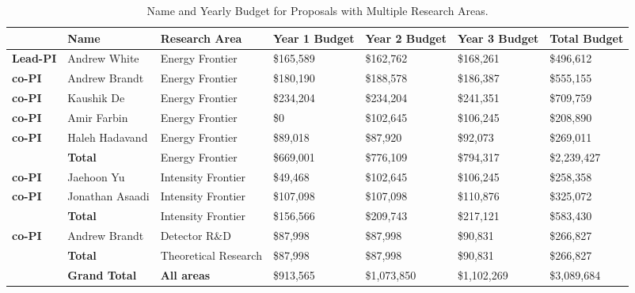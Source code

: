 \begin{table}[htb]
\centering
\begin{tabular}{ || l || l |  p{1.7cm} | p{1.7cm} | p{1.7cm} || p{1.7cm} | p{1.8cm} || }
\hline\hline\hline
 & \textbf{Name} & \textbf{Research Area} & \textbf{Year 1 Budget} & \textbf{Year 2 Budget} & \textbf{Year 3 Budget} & \textbf{Total Budget} \\ \hline\hline
\textbf{Lead-PI} & Andrew White & Energy Frontier & \$165,589 & \$162,762 & \$168,261 & \$496,612 \\ \hline
\textbf{co-PI} & Andrew Brandt & Energy Frontier & \$180,190 & \$188,578 & \$186,387 & \$555,155 \\ \hline
\textbf{co-PI} & Kaushik De & Energy Frontier & \$234,204 & \$234,204 & \$241,351 & \$709,759  \\ \hline
\textbf{co-PI} & Amir Farbin & Energy Frontier & \$0 & \$102,645 & \$106,245 & \$208,890 \\ \hline
\textbf{co-PI} & Haleh Hadavand & Energy Frontier & \$89,018 & \$87,920 & \$92,073 & \$269,011 \\ \hline\hline
 & \textbf{Total} & Energy Frontier & \$669,001 & \$776,109 & \$794,317 & \$2,239,427 \\ \hline\hline
\textbf{co-PI} & Jaehoon Yu & Intensity Frontier & \$49,468 & \$102,645 & \$106,245 & \$258,358 \\ \hline
\textbf{co-PI} & Jonathan Asaadi & Intensity Frontier & \$107,098 & \$107,098 & \$110,876 & \$325,072 \\ \hline\hline
 & \textbf{Total} & Intensity Frontier & \$156,566 & \$209,743 & \$217,121 & \$583,430 \\ \hline\hline
\textbf{co-PI} & Andrew Brandt & Detector R\&D & \$87,998 & \$87,998 & \$90,831 & \$266,827 \\ \hline\hline
 & \textbf{Total} & Theoretical Research & \$87,998 & \$87,998 & \$90,831 & \$266,827 \\ \hline\hline\hline
 & \textbf{Grand Total} & \textbf{All areas} & \$913,565 & \$1,073,850 & \$1,102,269 & \$3,089,684 \\ \hline\hline\hline
\end{tabular}
\caption{Name and Yearly Budget for Proposals with Multiple Research Areas.}
\end{table}
